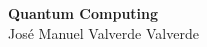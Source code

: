 \documentclass{article}
\begin{document}
\onehalfspacing

\begin{titlepage}
    \centering
    \vspace*{5cm} %
    {\LARGE \textbf{Quantum Computing}}\\[1cm]
    {José Manuel Valverde Valverde} %
    \vfill
\end{titlepage}



\end{document}
